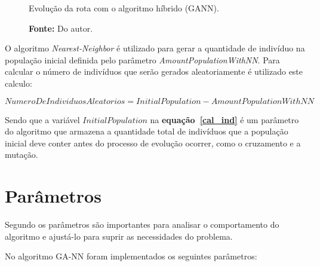 \documentclass[12pt,openright,a4paper,oneside]{tcc}
\begin{document}
		\begin{figure}[h]
			\centering
            \caption{Evolução da rota com o algoritmo híbrido (GANN).}
			\caption*{\textbf{Fonte:} Do autor.}
			\label{figagnn}
		\end{figure}


		O algoritmo \textit{Nearest-Neighbor} é utilizado para gerar a quantidade de indivíduo na população inicial definida pelo parâmetro \textit{AmountPopulationWithNN}. Para calcular o número de indivíduos que serão gerados aleatoriamente é utilizado este calculo:

			\begin{equation}
				\label{cal_ind}
		 		NumeroDeIndividuosAleatorios = InitialPopulation - AmountPopulationWithNN 
		 	\end{equation} 
		
		Sendo que a variável $InitialPopulation$ na \textbf{equação~\ref{cal_ind}} é um parâmetro do algoritmo que armazena a quantidade total de indivíduos que a população inicial deve conter antes do processo de evolução ocorrer, como o cruzamento e a mutação.

        \section{Parâmetros}
        
        Segundo  os parâmetros são importantes para analisar o comportamento do algoritmo e ajustá-lo para suprir as necessidades do problema. 
        
        No algoritmo GA-NN foram implementados os seguintes parâmetros:
         
\end{document}
